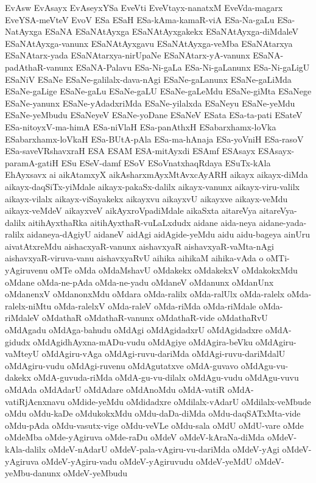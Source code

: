 {EvAsw
EvAsayx
EvAseyxYSa
EveVti
EveVtayx-nanatxM
EveVda-magarx
EveYSA-meVteV
EvoV
ESa
ESaH
ESa-kAma-kamaR-viA
ESa-Na-gaLu
ESa-NatAyxga
ESaNA
ESaNAtAyxga
ESaNAtAyxgakekx
ESaNAtAyxga-diMdaleV
ESaNAtAyxga-vanunx
ESaNAtAyxgavu
ESaNAtAyxga-veMba
ESaNAtarxya
ESaNAtarx-yada
ESaNAtarxya-nirUpaNe
ESaNAtarx-yA-vanunx
ESaNA-padAthaR-vanunx
ESaNA-Palavu
ESa-Ni-gaLa
ESa-Ni-gaLanunx
ESa-Ni-gaLigU
ESaNiV
ESaNe
ESaNe-galilalx-dava-nAgi
ESaNe-gaLanunx
ESaNe-gaLiMda
ESaNe-gaLige
ESaNe-gaLu
ESaNe-gaLU
ESaNe-gaLeMdu
ESaNe-giMta
ESaNege
ESaNe-yanunx
ESaNe-yAdadxriMda
ESaNe-yilalxda
ESaNeyu
ESaNe-yeMdu
ESaNe-yeMbudu
ESaNeyeV
ESaNe-yoDane
ESaNeV
ESata
ESa-ta-pati
ESateV
ESa-nitoyxV-ma-himA
ESa-niVlaH
ESa-panAthxH
ESabarxhamx-loVka
ESabarxhamx-loVkaH
ESa-BUtA-pAla
ESa-ma-hAnaja
ESa-yoVniH
ESa-rasoV
ESa-saveVRshavxraH
ESA
ESAM
ESA-mitAyxdi
ESAmf
ESAsayx
ESAsayx-paramA-gatiH
ESu
ESeV-damf
ESoV
ESoVnatxhaqRdaya
ESuTx-kAla
EhAyxsavx
ai
aikAtamxyX
aikAsharxmAyxMtAvxcAyARH
aikayx
aikayx-diMda
aikayx-daqSiTx-yiMdale
aikayx-pakaSx-dalilx
aikayx-vanunx
aikayx-viru-valilx
aikayx-vilalx
aikayx-viSayakekx
aikayxvu
aikayxvU
aikayxve
aikayx-veMdu
aikayx-veMdeV
aikayxveV
aikAyxroVpadiMdale
aikaSxta
aitareVya
aitareVya-dalilx
aitihAyxthaRka
aitihAyxthaR-vuLaLxdudx
aidane
aida-neya
aidane-yada-ralilx
aidaneya-dAgiyU
aidaneV
aidAgi
aidAgide-yeMdu
aidu
aidu-bageya
ainUru
aivatAtxreMdu
aishacxyaR-vanunx
aishavxyaR
aishavxyaR-vaMta-nAgi
aishavxyaR-viruva-vanu
aishavxyaRvU
aihika
aihikaM
aihika-vAda
o
oMTi-yAgiruvenu
oMTe
oMda
oMdaMshavU
oMdakekx
oMdakekxV
oMdakokxMdu
oMdane
oMda-ne-pAda
oMda-ne-yadu
oMdaneV
oMdanunx
oMdanUnx
oMdanenxV
oMdanonxMdu
oMdara
oMda-ralilx
oMda-ralUlx
oMda-ralelx
oMda-ralelx-niMtu
oMda-ralelxV
oMda-raleV
oMda-riMda
oMda-riMdale
oMda-riMdaleV
oMdathaR
oMdathaR-vanunx
oMdathaR-vide
oMdathaRvU
oMdAgadu
oMdAga-bahudu
oMdAgi
oMdAgidadxrU
oMdAgidadxre
oMdA-gidudx
oMdAgidhAyxna-mADu-vudu
oMdAgiye
oMdAgira-beVku
oMdAgiru-vaMteyU
oMdAgiru-vAga
oMdAgi-ruvu-dariMda
oMdAgi-ruvu-dariMdalU
oMdAgiru-vudu
oMdAgi-ruvenu
oMdAgutatxve
oMdA-guvavo
oMdAgu-vu-dakekx
oMdA-guvuda-riMda
oMdA-gu-vu-dilalx
oMdAgu-vudu
oMdAgu-vuvu
oMdAda
oMdAdarU
oMdAdare
oMdAnoMdu
oMdA-vatiR
oMdA-vatiRjAcnxnavu
oMdide-yeMdu
oMdidadxre
oMdilalx-vAdarU
oMdilalx-veMbude
oMdu
oMdu-kaDe
oMdukokxMdu
oMdu-daDa-diMda
oMdu-daqSATxMta-vide
oMdu-pAda
oMdu-vasutx-vige
oMdu-veVLe
oMdu-sala
oMdU
oMdU-vare
oMde
oMdeMba
oMde-yAgiruva
oMde-raDu
oMdeV
oMdeV-kAraNa-diMda
oMdeV-kAla-dalilx
oMdeV-nAdarU
oMdeV-pala-vAgiru-vu-dariMda
oMdeV-yAgi
oMdeV-yAgiruva
oMdeV-yAgiru-vadu
oMdeV-yAgiruvudu
oMdeV-yeMdU
oMdeV-yeMbu-danunx
oMdeV-yeMbudu
}
